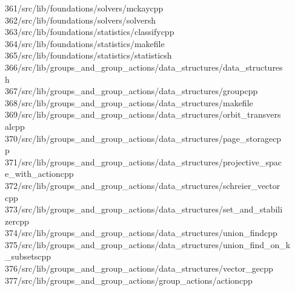 \begin{tabbing}
361\>/src/lib/foundations/solvers/mckaycpp\\[0pt]
362\>/src/lib/foundations/solvers/solversh\\[0pt]
363\>/src/lib/foundations/statistics/classifycpp\\[0pt]
364\>/src/lib/foundations/statistics/makefile\\[0pt]
365\>/src/lib/foundations/statistics/statisticsh\\[0pt]
366\>/src/lib/groups\_and\_group\_actions/data\_structures/data\_structures\\[0pt]
\>h\\[0pt]
367\>/src/lib/groups\_and\_group\_actions/data\_structures/groupcpp\\[0pt]
368\>/src/lib/groups\_and\_group\_actions/data\_structures/makefile\\[0pt]
369\>/src/lib/groups\_and\_group\_actions/data\_structures/orbit\_transvers\\[0pt]
\>alcpp\\[0pt]
370\>/src/lib/groups\_and\_group\_actions/data\_structures/page\_storagecp\\[0pt]
\>p\\[0pt]
371\>/src/lib/groups\_and\_group\_actions/data\_structures/projective\_spac\\[0pt]
\>e\_with\_actioncpp\\[0pt]
372\>/src/lib/groups\_and\_group\_actions/data\_structures/schreier\_vector\\[0pt]
\>cpp\\[0pt]
373\>/src/lib/groups\_and\_group\_actions/data\_structures/set\_and\_stabili\\[0pt]
\>zercpp\\[0pt]
374\>/src/lib/groups\_and\_group\_actions/data\_structures/union\_findcpp\\[0pt]
375\>/src/lib/groups\_and\_group\_actions/data\_structures/union\_find\_on\_k\\[0pt]
\>\_subsetscpp\\[0pt]
376\>/src/lib/groups\_and\_group\_actions/data\_structures/vector\_gecpp\\[0pt]
377\>/src/lib/groups\_and\_group\_actions/group\_actions/actioncpp\\[0pt]

\end{tabbing}
